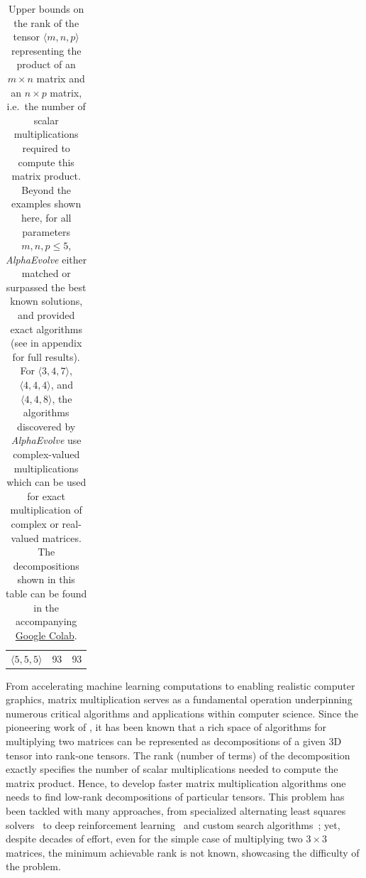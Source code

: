 \documentclass[logo,copyright,12pt]{googledeepmind}
\theoremstyle{definition}
\theoremstyle{remark}
\theoremstyle{plain}
\newcommand{\ResultsColabURL}{https://colab.research.google.com/github/google-deepmind/alphaevolve\_results/blob/master/mathematical\_results.ipynb}
\newcommand{\ResultsColab}{the accompanying \href{\ResultsColabURL}{Google Colab}}
\newcommand{\method}{\emph{AlphaEvolve}\xspace}
\begin{document}
\begin{table}[t]
\begin{center}
\begin{tabular}{ccc}
    $\langle 5, 5, 5 \rangle$ & 93 \citep{flip_graphs_with_symmetry}  & 93  \\ 
    \end{tabular}
\caption{
Upper bounds on the rank of the tensor $\langle m,n,p \rangle$ representing the product of an $m\times n$ matrix and an $n\times p$ matrix, i.e.~the number of scalar multiplications required to compute this matrix product.
Beyond the examples shown here, for all parameters $m,n,p\leq 5$, \method either matched or surpassed the best known solutions, and provided exact algorithms (see  in appendix for full results).
For $\langle 3, 4, 7\rangle$, $\langle 4, 4, 4\rangle$, and $\langle 4, 4, 8\rangle$, the algorithms discovered by \method use complex-valued multiplications which can be used for exact multiplication of complex or real-valued matrices.
The decompositions shown in this table can be found in \ResultsColab.
}
    \label{tab:relaxed-opt-results}
\end{center}
\end{table}

From accelerating machine learning computations to enabling realistic computer graphics, matrix multiplication serves as a fundamental operation underpinning numerous critical algorithms and applications within computer science.
Since the pioneering work of \citet{strassen1969gaussian}, it has been known that a rich space of algorithms for multiplying two matrices can be represented as decompositions of a given 3D tensor into rank-one tensors.
The rank (number of terms) of the decomposition exactly specifies the number of scalar multiplications needed to compute the matrix product.
Hence, to develop faster matrix multiplication algorithms one needs to find low-rank decompositions of particular tensors.
This problem has been tackled with many approaches, from specialized alternating least squares solvers~\citep{smirnov2013bilinear} to deep reinforcement learning~\citep{fawzi2022discovering} and custom search algorithms~\cite{kauers2023flip}; yet, despite decades of effort, even for the simple case of multiplying two $3\times 3$ matrices, the minimum achievable rank is not known, showcasing the difficulty of the problem.
\end{document}
